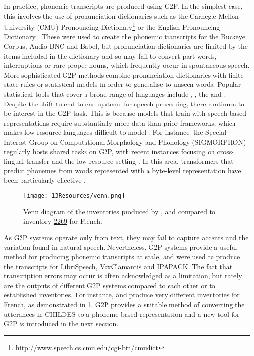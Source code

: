 In practice, phonemic transcripts are produced using G2P. In the simplest case, this involves the use of pronunciation dictionaries such as the Carnegie Mellon University (CMU) Pronouncing Dictionary\footnote{\url{http://www.speech.cs.cmu.edu/cgi-bin/cmudict}} or the English Pronouncing Dictionary \citep{jones2011cambridge}. These were used to create the phonemic transcripts for the Buckeye Corpus, Audio BNC and Babel, but pronunciation dictionaries are limited by the items included in the dictionary and so may fail to convert part-words, interruptions or rare proper nouns, which frequently occur in spontaneous speech. More sophisticated G2P methods combine pronunciation dictionaries with finite-state rules \citep{kaplan1994regular} or statistical models \citep{bisani-2008-g2p} in order to generalise to unseen words. Popular statistical tools that cover a broad range of languages include  \citep{NOVAK_MINEMATSU_HIROSE_2016}, \epitran \citep{Mortensen-et-al:2018}, the  \citep{johnson2020g2p} and \phonemizer \citep{Bernard2021}. Despite the shift to end-to-end systems for speech processing, there continues to be interest in the G2P task. This is because models that train with speech-based representations require substantially more data than prior frameworks, which makes low-resource languages difficult to model \citep{li2022recent}. For instance, the Special Interest Group on Computational Morphology and Phonology (SIGMORPHON) regularly hosts shared tasks on G2P, with recent instances focusing on cross-lingual transfer and the low-resource setting \citep{mccarthy-etal-2023-sigmorphon}. In this area, transformers that predict phonemes from words represented with a byte-level representation have been particularly effective \citep{Zhu2022}. 

\begin{figure}[t]
    \centering
    \texttt{[image: 13Resources/venn.png]}
    \caption{Venn diagram of the inventories produced by \phonemizer, \epitran and \gpp compared to \phoible inventory \href{https://phoible.org/inventories/view/2269}{2269} for French.}
    \label{fig:13-venn}
\end{figure}

As G2P systems operate only from text, they may fail to capture accents and the variation found in natural speech. Nevertheless, G2P systems provide a useful method for producing phonemic transcripts at scale, and were used to produce the transcripts for LibriSpeech, VoxClamantis and IPAPACK. The fact that transcription errors may occur is often acknowledged as a limitation, but rarely are the outputs of different G2P systems compared to each other or to established inventories. For instance, \epitran and \phonemizer produce very different inventories for French, as demonstrated in \cref{fig:13-venn}. G2P provides a suitable method of converting the utterances in CHILDES to a phoneme-based representation and a new tool for G2P is introduced in the next section.

